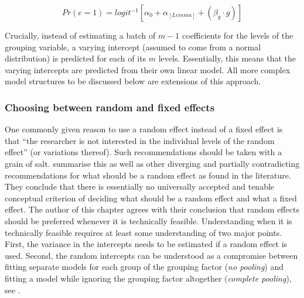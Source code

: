 \begin{equation}
  Pr(c=1)=logit^{-1}\left[\alpha_0+\alpha_{[Lemma]}+(\beta_{g}\cdot g)\right]
  \label{eq:002a}
\end{equation}

Crucially, instead of estimating a batch of $m-1$ coefficients for the levels of the grouping variable, a varying intercept (assumed to come from a normal distribution) is predicted for each of its $m$ levels.
Essentially, this means that the varying intercepts are predicted from their own linear model.
All more complex model structures to be discussed below are extensions of this approach.

\subsubsection{Choosing between random and fixed effects}
\label{sec:choosingbetweenrandomandfixedeffects}

One commonly given reason to use a random effect instead of a fixed effect is that ``the researcher is not interested in the individual levels of the random effect'' (or variations thereof).
Such recommendations should be taken with a grain of salt.
\citet[245--247]{GelmanHill2006} summarise this as well as other diverging and partially contradicting recommendations for what should be a random effect as found in the literature.
They conclude that there is essentially no universally accepted and tenable conceptual criterion of deciding what should be a random effect and what a fixed effect.
The author of this chapter agrees with their conclusion that random effects should be preferred whenever it is technically feasible.
Understanding when it is technically feasible requires at least some understanding of two major points.
First, the variance in the intercepts needs to be estimated if a random effect is used.
Second, the random intercepts can be understood as a compromise between fitting separate models for each group of the grouping factor (\textit{no pooling}) and fitting a model while ignoring the grouping factor altogether (\textit{complete pooling}), see \citet[Ch.~12]{GelmanHill2006}.

